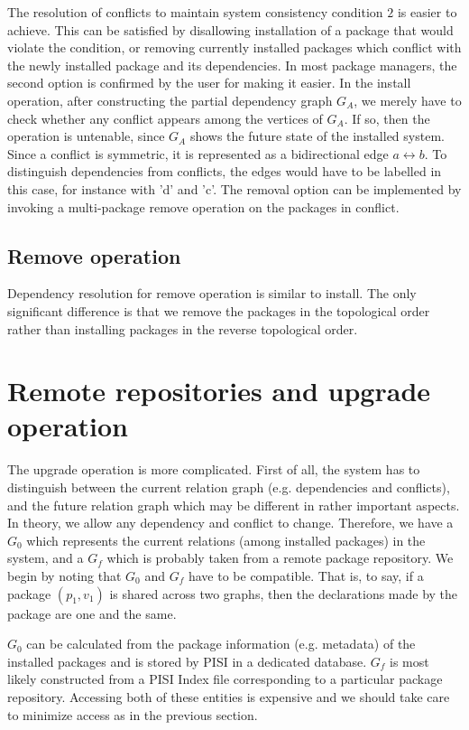 \documentclass[a4paper,11pt]{article}
\begin{document}
The resolution of conflicts to maintain system consistency condition
$2$ is easier to achieve. This can be satisfied by disallowing
installation of a package that would violate the condition, or
removing currently installed packages which conflict with the newly
installed package and its dependencies. In most package managers, the
second option is confirmed by the user for making it easier. In the
install operation, after constructing the partial dependency graph
$G_A$, we merely have to check whether any conflict appears among the
vertices of $G_A$. If so, then the operation is untenable, since $G_A$
shows the future state of the installed system. Since a conflict is
symmetric, it is represented as a bidirectional edge $a \leftrightarrow b$. To
distinguish dependencies from conflicts, the edges would have to be
labelled in this case, for instance with 'd' and 'c'. The removal
option can be implemented by invoking a multi-package remove operation
on the packages in conflict.

\subsection{Remove operation}

Dependency resolution for remove operation is similar to install.  The
only significant difference is that we remove the packages in the
topological order rather than installing packages in the reverse
topological order.

\section{Remote repositories and upgrade operation}
 

The upgrade operation is more complicated. First of all, the system
has to distinguish between the current relation graph (e.g.
dependencies and conflicts), and the future relation graph which may
be different in rather important aspects. In theory, we allow any
dependency and conflict to change. Therefore, we have a $G_0$ which
represents the current relations (among installed packages) in the
system, and a $G_f$ which is probably taken from a remote package
repository. We begin by noting that $G_0$ and $G_f$ have to be
compatible. That is, to say, if a package $(p_1,v_1)$ is shared across
two graphs, then the declarations made by the package are one and the
same.

$G_0$ can be calculated from the package information (e.g. metadata)
of the installed packages and is stored by PISI in a dedicated
database. $G_f$ is most likely constructed from a PISI Index file
corresponding to a particular package repository. Accessing both of
these entities is expensive and we should take care to minimize access
as in the previous section.
\end{document}
